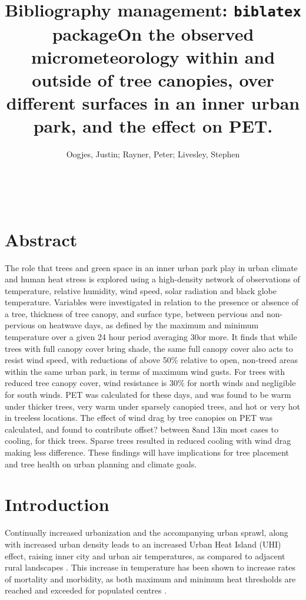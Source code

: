 \documentclass[twocolumn, a4paper]{article}
\title{Bibliography management: \texttt{biblatex} package}
\begin{document}
	\title{On the observed micrometeorology within and outside of tree canopies, over different surfaces in an inner urban park, and the effect on PET.}
	\maketitle
	\author{Oogjes, Justin; Rayner, Peter; Livesley, Stephen}
	\\
	\section*{Abstract}
The role that trees and green space in an inner urban park play in urban climate and human heat stress is explored using a high-density network of observations of temperature, relative humidity, wind speed, solar radiation and black globe temperature. Variables were investigated in relation to the presence or absence of a tree, thickness of tree canopy, and surface type, between pervious and non-pervious on heatwave days, as defined by the maximum and minimum temperature over a given 24 hour period averaging 30\celsius or more. It finds that while trees with full canopy cover bring shade, the same full canopy cover also acts to resist wind speed, with reductions of above 50\% relative to open, non-treed areas within the same urban park, in terms of maximum wind gusts. For trees with reduced tree canopy cover, wind resistance is 30\% for north winds and negligible for south winds. PET was calculated for these days, and was found to be warm under thicker trees, very warm under sparsely canopied trees, and hot or very hot in treeless locations. The effect of wind drag by tree canopies on PET was calculated, and found to contribute offset? between 8\celsius and 13\celsius in most cases to cooling, for thick trees. Sparse trees resulted in reduced cooling with wind drag making less difference. These findings will have implications for tree placement and tree health on urban planning and climate goals.

\newpage \section{Introduction}
Continually increased urbanization and the accompanying urban sprawl, along with increased urban density \cite{RN302} leads to an increased Urban Heat Island (UHI) effect, raising inner city and urban air temperatures, as compared to adjacent rural landscapes \cite{RN2016} \cite{RN2057}. This increase in temperature has been shown to increase rates of mortality and morbidity, as both maximum and minimum heat thresholds are reached and exceeded for populated centres \cite{RN577} \cite{RN2041}.
\end{document}
